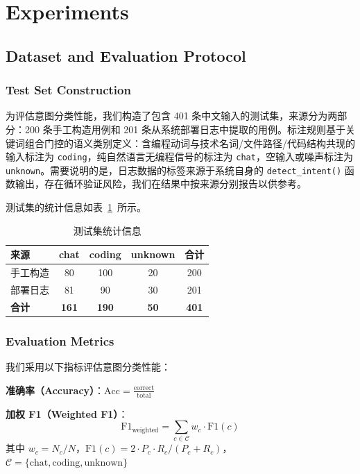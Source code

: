 \section{Experiments}

\subsection{Dataset and Evaluation Protocol}

\subsubsection{Test Set Construction}

为评估意图分类性能，我们构造了包含 401 条中文输入的测试集，来源分为两部分：200 条手工构造用例和 201 条从系统部署日志中提取的用例。标注规则基于关键词组合门控的语义类别定义：含编程动词与技术名词/文件路径/代码结构共现的输入标注为 \texttt{coding}，纯自然语言无编程信号的标注为 \texttt{chat}，空输入或噪声标注为 \texttt{unknown}。需要说明的是，日志数据的标签来源于系统自身的 \texttt{detect\_intent()} 函数输出，存在循环验证风险，我们在结果中按来源分别报告以供参考。

测试集的统计信息如表~\ref{tab:dataset}~所示。

\begin{table}[htbp]
\centering
\caption{测试集统计信息}
\label{tab:dataset}
\begin{tabular}{lcccc}
\toprule
\textbf{来源} & \textbf{chat} & \textbf{coding} & \textbf{unknown} & \textbf{合计} \\
\midrule
手工构造 & 80 & 100 & 20 & 200 \\
部署日志 & 81 & 90 & 30 & 201 \\
\midrule
\textbf{合计} & \textbf{161} & \textbf{190} & \textbf{50} & \textbf{401} \\
\bottomrule
\end{tabular}
\end{table}

\subsubsection{Evaluation Metrics}

我们采用以下指标评估意图分类性能：

\textbf{准确率（Accuracy）}：$\text{Acc} = \frac{\text{correct}}{\text{total}}$

\textbf{加权 F1（Weighted F1）}：
\[
\text{F1}_{\text{weighted}} = \sum_{c \in \mathcal{C}} w_c \cdot \text{F1}(c)
\]
其中 $w_c = N_c / N$，$\text{F1}(c) = 2 \cdot P_c \cdot R_c / (P_c + R_c)$，
$\mathcal{C} = \{\text{chat}, \text{coding}, \text{unknown}\}$

